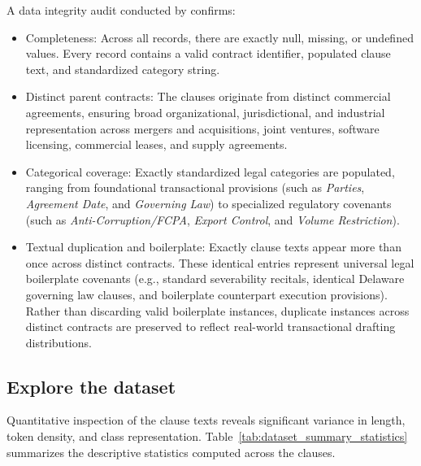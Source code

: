 A data integrity audit conducted by  confirms:
\begin{itemize}
    \item Completeness: Across all \TotalClauses{} records, there are exactly \NullValueCount{} null, missing, or undefined values. Every record contains a valid contract identifier, populated clause text, and standardized category string.
    \item Distinct parent contracts: The clauses originate from \TotalContracts{} distinct commercial agreements, ensuring broad organizational, jurisdictional, and industrial representation across mergers and acquisitions, joint ventures, software licensing, commercial leases, and supply agreements.
    \item Categorical coverage: Exactly \NumClasses{} standardized legal categories are populated, ranging from foundational transactional provisions (such as \textit{Parties}, \textit{Agreement Date}, and \textit{Governing Law}) to specialized regulatory covenants (such as \textit{Anti-Corruption/FCPA}, \textit{Export Control}, and \textit{Volume Restriction}).
    \item Textual duplication and boilerplate: Exactly \DuplicateClauseCount{} clause texts appear more than once across distinct contracts. These identical entries represent universal legal boilerplate covenants (e.g., standard severability recitals, identical Delaware governing law clauses, and boilerplate counterpart execution provisions). Rather than discarding valid boilerplate instances, duplicate instances across distinct contracts are preserved to reflect real-world transactional drafting distributions.
\end{itemize}

\subsection{Explore the dataset}
\label{subsec:explore_dataset}

Quantitative inspection of the clause texts reveals significant variance in length, token density, and class representation. Table~\ref{tab:dataset_summary_statistics} summarizes the descriptive statistics computed across the \TotalClauses{} clauses.

